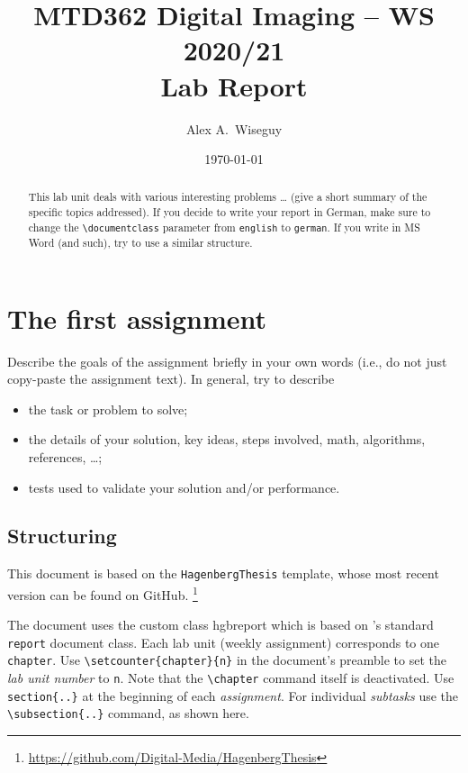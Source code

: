 \documentclass[english,notitlepage,smartquotes]{hgbreport}
\author{Alex A.\ Wiseguy}
\title{MTD362 Digital Imaging -- WS 2020/21\\
				Lab Report \arabic{chapter}}
\date{\today}
\renewcommand{\chapter}[1]{}	%
\begin{document}
\maketitle

\begin{abstract}\noindent
This lab unit deals with various interesting problems  \ldots 
(give a short summary of the specific topics addressed).
If you decide to write your report in German, make sure to
change the \verb!\documentclass! parameter from \texttt{english}
to \texttt{german}.
If you write in MS Word (and such), try to use a similar structure.
\end{abstract}



\section{The first assignment}

Describe the goals of the assignment briefly in your own words
(i.e., do not just copy-paste the assignment text).
In general, try to describe
\begin{itemize}
\item
	the task or problem to solve;
\item
	the details of your solution, key ideas, steps involved, math, algorithms,
	references, \ldots ;
\item
	tests used to validate your solution and/or performance.
\end{itemize}

\subsection{Structuring}	%

This \latex document is based on the \texttt{HagenbergThesis} 
template, whose most recent version can be found on GitHub.%
\footnote{\url{https://github.com/Digital-Media/HagenbergThesis}}

The document uses the custom class \textsf{hgbreport} which is based
on \latex's standard \texttt{report} document class. Each lab unit 
(weekly assignment) corresponds to one \texttt{chapter}.
Use \verb!\setcounter{chapter}{n}! in the document's preamble
to set the \emph{lab unit number} to \texttt{n}.
Note that the \verb!\chapter! command itself is deactivated.
Use \verb!section{..}! at the beginning of each \emph{assignment}.
For individual \emph{subtasks} use the 
\verb!\subsection{..}! command, as shown here.
\end{document}
